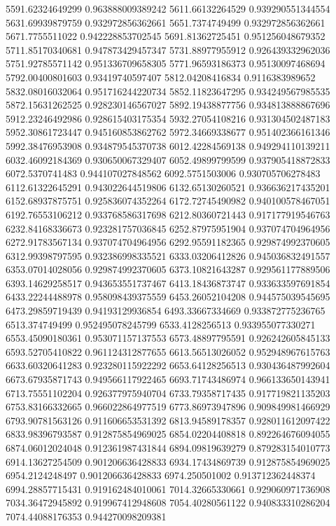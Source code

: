 {5591.62324649299 0.963888009389242
5611.66132264529 0.939290551344554
5631.69939879759 0.932972856362661
5651.7374749499 0.932972856362661
5671.7755511022 0.942228853702545
5691.81362725451 0.951256048679352
5711.85170340681 0.947873429457347
5731.88977955912 0.926439332962036
5751.92785571142 0.951336709658305
5771.96593186373 0.95130097468694
5792.00400801603 0.93419740597407
5812.04208416834 0.9116383989652
5832.08016032064 0.951716244220734
5852.11823647295 0.934249567985535
5872.15631262525 0.928230146567027
5892.19438877756 0.934813888867696
5912.23246492986 0.928615403175354
5932.27054108216 0.931304502487183
5952.30861723447 0.945160853862762
5972.34669338677 0.951402366161346
5992.38476953908 0.934879545370738
6012.42284569138 0.949294110139211
6032.46092184369 0.930650067329407
6052.49899799599 0.937905418872833
6072.5370741483 0.944107027848562
6092.5751503006 0.930705706278483
6112.61322645291 0.943022644519806
6132.65130260521 0.936636217435201
6152.68937875751 0.925836074352264
6172.72745490982 0.940100578467051
6192.76553106212 0.933768586317698
6212.80360721443 0.917177919546763
6232.84168336673 0.923281757036845
6252.87975951904 0.937074704964956
6272.91783567134 0.937074704964956
6292.95591182365 0.929874992370605
6312.99398797595 0.932386998335521
6333.03206412826 0.945036832491557
6353.07014028056 0.929874992370605
6373.10821643287 0.929561177889506
6393.14629258517 0.943653551737467
6413.18436873747 0.933633597691854
6433.22244488978 0.958098439375559
6453.26052104208 0.944575039545695
6473.29859719439 0.94193129936854
6493.33667334669 0.933872775236765
6513.374749499 0.952495078245799
6533.4128256513 0.933955077330271
6553.45090180361 0.953071157137553
6573.48897795591 0.926242605845133
6593.52705410822 0.961124312877655
6613.56513026052 0.952948967615763
6633.60320641283 0.923280115922292
6653.64128256513 0.930436487992604
6673.67935871743 0.949566117922465
6693.71743486974 0.966133650143941
6713.75551102204 0.926377975940704
6733.79358717435 0.917719821135203
6753.83166332665 0.966022864977519
6773.86973947896 0.909849981466929
6793.90781563126 0.911606653531392
6813.94589178357 0.928011612097422
6833.98396793587 0.912875854969025
6854.02204408818 0.892264676094055
6874.06012024048 0.912361987431844
6894.09819639279 0.879283154010773
6914.13627254509 0.901206636428833
6934.17434869739 0.912875854969025
6954.2124248497 0.901206636428833
6974.250501002 0.913712362448374
6994.28857715431 0.919162484010061
7014.32665330661 0.929060971736908
7034.36472945892 0.919967412948608
7054.40280561122 0.940833310286204
7074.44088176353 0.944270098209381
}
